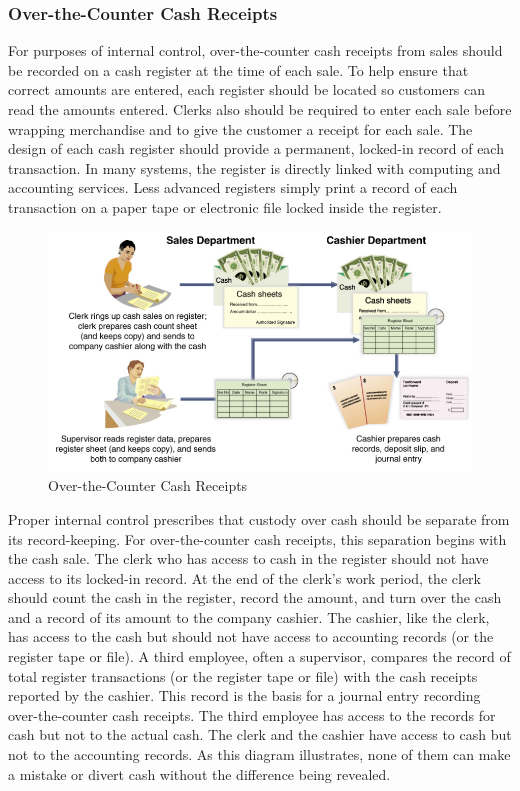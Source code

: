 \documentclass[../main.tex]{subfiles}
\begin{document}
	\subsubsection{Over-the-Counter Cash Receipts}
	
	For purposes of internal control, over-the-counter cash receipts from sales 
	should be recorded on a cash register at the time of each sale. To help 
	ensure that correct amounts are entered, each register should be located so 
	customers can read the amounts entered. Clerks also should be required to 
	enter each sale before wrapping merchandise and to give the customer a 
	receipt for each sale. The design of each cash register should provide a 
	permanent, locked-in record of each transaction. In many systems, the 
	register is directly linked with computing and accounting services. Less 
	advanced registers simply print a record of each transaction on a paper 
	tape or electronic file locked inside the register. 
	
	\begin{figure}[ht]
		\centering
		\includegraphics[width=1\columnwidth]{images/c5/otc_cash_receipts.png}
		\caption{Over-the-Counter Cash Receipts}
	\end{figure}
	
	Proper internal control prescribes that custody over cash should be 
	separate from its record-keeping. For over-the-counter cash receipts, this 
	separation begins with the cash sale. The clerk who has access to cash in 
	the register should not have access to its locked-in record. At the end of 
	the clerk’s work period, the clerk should count the cash in the register, 
	record the amount, and turn over the cash and a record of its amount to the 
	company cashier. The cashier, like the clerk, has access to the cash but 
	should not have access to accounting records (or the register tape or 
	file). A third employee, often a supervisor, compares the record of total 
	register transactions (or the register tape or file) with the cash receipts 
	reported by the cashier. This record is the basis for a journal entry 
	recording over-the-counter cash receipts. The third employee has access to 
	the records for cash but not to the actual cash. The clerk and the cashier 
	have access to cash but not to the accounting records. As this diagram 
	illustrates, none of them can make a mistake or divert cash without the 
	difference being revealed. 
	
\end{document}
